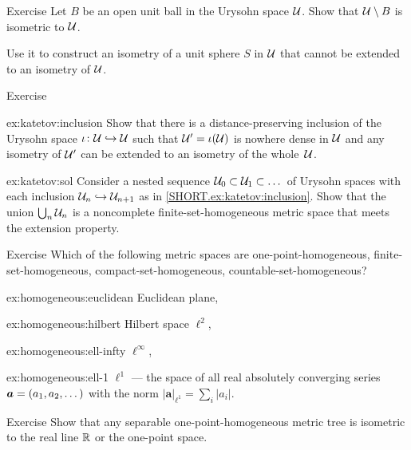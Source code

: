 \begin{thm}{Exercise}\label{ex:ext(shere)}
Let $B$ be an open unit ball in the Urysohn space $\mathcal{U}$.
Show that $\mathcal{U}\setminus B$ is isometric to $\mathcal{U}$.

Use it to construct an isometry of a unit sphere $S$ in $\mathcal{U}$ that cannot be extended to an isometry of $\mathcal{U}$.
\end{thm}

\begin{thm}{Exercise}\label{ex:katetov}

\begin{subthm}{ex:katetov:inclusion}
Show that there is a distance-preserving inclusion of the Urysohn space $\iota\colon\mathcal{U}\hookrightarrow \mathcal{U}$ 
such that $\mathcal{U}'=\iota(\mathcal{U})$ is nowhere dense in $\mathcal{U}$ and any isometry of $\mathcal{U}'$ 
can be extended to an isometry of the whole~$\mathcal{U}$.
\end{subthm}

\begin{subthm}{ex:katetov:sol}
Consider a nested sequence $\mathcal{U}_0\subset \mathcal{U}_1\subset\dots$ of Urysohn spaces 
with each inclusion $\mathcal{U}_n\hookrightarrow \mathcal{U}_{n+1}$ as in \ref{SHORT.ex:katetov:inclusion}.
Show that the union $\bigcup_n\mathcal{U}_n$ is a noncomplete finite-set-homogeneous metric space that meets the extension property.
\end{subthm}

\end{thm}

{\sloppy

\begin{thm}{Exercise}\label{ex:homogeneous}
Which of the following metric spaces are 
one-point-homogeneous, finite-set-homogeneous, compact-set-homogeneous, countable-set-homogeneous?

\begin{subthm}{ex:homogeneous:euclidean}
Euclidean plane,
\end{subthm}

\begin{subthm}{ex:homogeneous:hilbert}
 Hilbert space $\ell^2$,
\end{subthm}

\begin{subthm}{ex:homogeneous:ell-infty}
 $\ell^\infty$,
\end{subthm}

\begin{subthm}{ex:homogeneous:ell-1}
 $\ell^1$ --- the space of all real absolutely converging series $\bm{a}\z=(a_1,a_2,\dots)$ with the norm $|\bm{a}|_{\ell^1}=\sum_i|a_i|$.
 
\end{subthm}
\end{thm}

\begin{thm}{Exercise}\label{ex:homogeneous-tree}
Show that any separable one-point-homogeneous metric tree is isometric to the real line $\mathbb{R}$ or the one-point space.
\end{thm}

}

